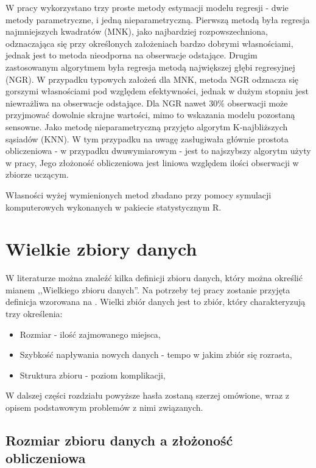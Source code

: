 \documentclass[man,mfu]{mgrwms}
\begin{document}
\begin{wstep}
W pracy wykorzystano trzy proste metody estymacji modelu regresji - dwie metody parametryczne, i jedną nieparametryczną. Pierwszą metodą była regresja najmniejszych kwadratów (MNK), jako najbardziej rozpowszechniona, odznaczająca się przy określonych założeniach bardzo dobrymi własnościami, jednak jest to metoda nieodporna na obserwacje odstające. Drugim  zastosowanym algorytmem była regresja metodą największej głębi regresyjnej (NGR). W przypadku typowych założeń dla  MNK, metoda NGR odznacza się gorszymi własnościami pod względem efektywności, jednak w dużym stopniu jest niewrażliwa na obserwacje odstające. Dla NGR nawet 30\% obserwacji może przyjmować dowolnie skrajne wartości, mimo to wskazania modelu pozostaną sensowne. Jako metodę nieparametryczną przyjęto algorytm K-najbliższych sąsiadów (KNN). W tym przypadku na uwagę zasługiwała głównie prostota obliczeniowa - w przypadku dwuwymiarowym - jest to najszybszy algorytm użyty w pracy, Jego złożoność obliczeniowa jest liniowa względem ilości obserwacji w zbiorze uczącym.

Własności wyżej wymienionych metod zbadano przy pomocy symulacji komputerowych wykonanych w pakiecie statystycznym R.



\end{wstep}

\chapter{Wielkie zbiory danych}

W literaturze można znaleźć kilka definicji zbioru danych, który można określić mianem ,,Wielkiego zbioru danych''. Na potrzeby tej pracy zostanie przyjęta definicja wzorowana na \cite{BDnow}. 
Wielki zbiór danych jest to zbiór, który charakteryzują trzy określenia:


\begin{itemize}
\item Rozmiar - ilość zajmowanego miejsca,
\item Szybkość napływania nowych danych - tempo w jakim zbiór się rozrasta,
\item Struktura zbioru - poziom komplikacji,
\end{itemize}

W dalszej części rozdziału powyższe hasła zostaną szerzej omówione, wraz z opisem podstawowym problemów z nimi związanych. 

\section{Rozmiar zbioru danych a złożoność obliczeniowa}
\end{document}
